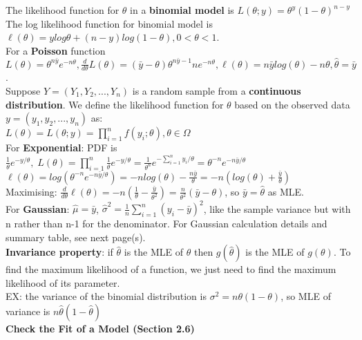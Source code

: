 \documentclass[a4paper,12pt]{article}
\begin{document}
\newpage
The likelihood function for $\theta$
in a \textbf{binomial model} is $L(\theta;y) = \theta^y(1-\theta)^{n-y}$
\\The log likelihood function for binomial model is $\ell(\theta) = ylog\theta+(n-y)log(1-\theta), 0 < \theta < 1$.
\\

For a \textbf{Poisson} function $L(\theta) =  \theta^{n\bar{y}}e^{-n\theta}, \frac{d}{d\theta}L({\theta}) = (\bar{y} - \theta)\theta^{n\bar{y}-1}ne^{-n\theta},  \ell({\theta}) = n\bar{y}log(\theta)-n\theta, \hat{\theta} = \bar{y}$.
\\

Suppose $Y = (Y_1, Y_2, ..., Y_n)$ is a random sample from a
\textbf{continuous distribution}. We define the likelihood function for $\theta$ based on the observed data
$y = (y_1, y_2, ..., y_n)$ as: 
\\$L(\theta) = L(\theta;y) = \prod_{i=1}^n f(y_i;\theta), \theta \in \Omega$
\\

For \textbf{Exponential}: PDF is $\frac{1}{\theta}e^{-y/\theta}, \; L(\theta) = \prod_{i=1}^n \frac{1}{\theta}e^{-y/\theta} = \frac{1}{\theta^n}e^{-\sum_{i=1}^ny_i/\theta} = \theta^{-n}e^{-n\bar{y}/\theta}$
\\$\ell(\theta) = log(\theta^{-n}e^{-n\bar{y}/\theta}) = -nlog(\theta) - \frac{n\bar{y}}{\theta} = -n(log(\theta)  + \frac{\bar{y}}{\theta})$
\\Maximising: $\frac{d}{d\theta}\ell({\theta}) = -n(\frac{1}{\theta} - \frac{\bar{y}}{\theta^2}) = \frac{n}{\theta^2}(\bar{y}-\theta)$, so $\bar{y} = \hat{\theta}$ as MLE.
\\

For \textbf{Gaussian}: $\hat{\mu} = \bar{y}$, $\hat{\sigma}^2 = \frac{1}{n}\sum_{i=1}^n{(y_i-\bar{y})}^2$, like the sample variance but with 
n rather than n-1 for the denominator. For Gaussian calculation details and summary table, see next page(s).
\\

\textbf{Invariance property}: if 
$\hat{\theta}$ is the MLE of $\theta$ then $g(\hat{\theta})$ is the MLE of 
$g(\theta)$. To find the maximum likelihood of a function, we just need to find the maximum likelihood of its parameter.
\\EX: the variance of the binomial distribution is $\sigma^2 = n\theta(1-\theta)$, so MLE of variance is $n\hat{\theta}(1-\hat{\theta})$
\\

\textbf{Check the Fit of a Model (Section 2.6)}
\\
\end{document}
